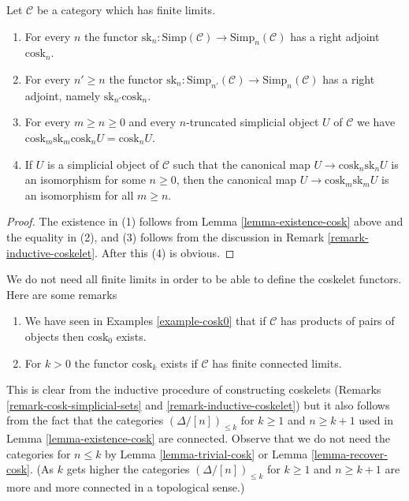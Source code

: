 \begin{lemma}
\label{lemma-cosk-up}
Let $\mathcal{C}$ be a category which has finite limits.
\begin{enumerate}
\item For every $n$ the functor $\text{sk}_n : \text{Simp}(\mathcal{C})
\to \text{Simp}_n(\mathcal{C})$ has a right adjoint $\text{cosk}_n$.
\item For every $n' \geq n$ the functor
$\text{sk}_n : \text{Simp}_{n'}(\mathcal{C}) \to \text{Simp}_n(\mathcal{C})$
has a right adjoint, namely $\text{sk}_{n'}\text{cosk}_n$.
\item For every $m \geq n \geq 0$ and every $n$-truncated simplicial
object $U$ of $\mathcal{C}$ we have
$\text{cosk}_m \text{sk}_m \text{cosk}_n U = \text{cosk}_n U$.
\item If $U$ is a simplicial object of $\mathcal{C}$ such that
the canonical map
$U \to \text{cosk}_n \text{sk}_nU$
is an isomorphism for some $n \geq 0$, then the canonical map
$U \to \text{cosk}_m \text{sk}_mU$
is an isomorphism for all $m \geq n$.
\end{enumerate}
\end{lemma}

\begin{proof}
The existence in (1) follows from Lemma \ref{lemma-existence-cosk} above
and the equality in (2), and (3) follows from the discussion
in Remark \ref{remark-inductive-coskelet}. After this (4) is obvious.
\end{proof}

\begin{remark}
\label{remark-existence-cosk}
We do not need all finite limits in order to be able to define
the coskelet functors. Here are some remarks
\begin{enumerate}
\item We have seen in Examples \ref{example-cosk0} that if $\mathcal{C}$
has products of pairs of objects then $\text{cosk}_0$ exists.
\item For $k > 0$ the functor $\text{cosk}_k$ exists if
$\mathcal{C}$ has finite connected limits.
\end{enumerate}
This is clear from the inductive procedure of constructing coskelets
(Remarks \ref{remark-cosk-simplicial-sets} and
\ref{remark-inductive-coskelet}) but it also follows from the fact that
the categories $(\Delta/[n])_{\leq k}$ for $k \geq 1$ and
$n \geq k + 1$ used in Lemma \ref{lemma-existence-cosk}
are connected. Observe that we do not need the categories
for $n \leq k$ by Lemma \ref{lemma-trivial-cosk} or
Lemma \ref{lemma-recover-cosk}. (As $k$ gets higher the categories
$(\Delta/[n])_{\leq k}$ for $k \geq 1$ and $n \geq k + 1$ are more
and more connected in a topological sense.)
\end{remark}

